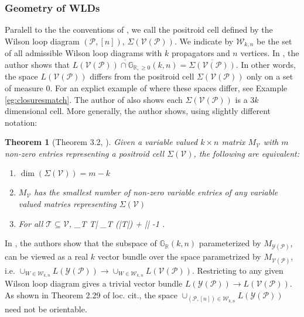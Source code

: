\documentclass[11pt]{article}
\newcommand{\R}{\mathbb{R}}
\newcommand{\Gr}{\mathbb{G}_{\R, \geq 0}}
\newcommand{\Grall}{\mathbb{G}_{\R}}
\def\bas #1\eas{\begin{align*} #1 \end{align*}}
\newcommand{\cP}{\mathcal{P}}
\newcommand{\cV}{\mathcal{V}}
\newcommand{\cY}{\mathcal{Y}}
\newcommand{\VP}{\cV(\cP)}
\newcommand{\YP}{\cY(\cP)}
\newcommand{\cW}{\mathcal{W}}
\newtheorem{thm}{Theorem}[section]
\theoremstyle{remark}
\theoremstyle{definition}
\begin{document}
\subsubsection{Geometry of WLDs \label{sec:geometry}}
Paralell to the the conventions of \cite{casestudy, generalcombinatorics1}, we call the positroid cell defined by the Wilson loop diagram $(\cP, [n])$, $\Sigma(\VP)$. We indicate by $\cW_{k,n}$ be the set of all admissible Wilson loop diagrams with $k$ propagators and $n$ vertices. In \cite[Theorem 8.4]{basisshapeloci}, the author shows that $\overline{L(\VP) \cap \Gr(k,n)} = \overline{\Sigma(\VP)}$. In other words, the space $L(\VP)$ differs from the positroid cell $\Sigma(\VP)$ only on a set of measure 0. For an explict example of where these spaces differ, see Example \ref{eg:closuresmatch}. The author of \cite{basisshapeloci} also shows each $\Sigma(\VP)$ is a $3k$ dimensional cell. More generally, the author shows, using slightly different notation:

\begin{thm}[Theorem 3.2, \cite{basisshapeloci}]\label{res:minimalrep}
Given a variable valued $k \times n$ matrix $M_\cV$ with $m$ non-zero entries representing a positroid cell $\Sigma(\cV)$, the following are equivalent:
\begin{enumerate}
\item $\dim(\Sigma(\cV)) = m -k$ 
\item $M_\cV$ has the smallest number of non-zero variable entries of any variable valued matries representing $\Sigma(\cV)$
\item For all $\mathcal{T} \subseteq \cV$, \bas |\bigcup_{T \in {}}T| \geq \max_{T \in  {}} (|T|) + || -1 \;. \eas
\end{enumerate}
\end{thm}


In \cite[section 2.3]{non-orientable}, the authors show that  the subspace of $\Grall(k,n)$ parameterized by $M_{\YP}$, can be viewed as a real $k$ vector bundle over the space parametrized by $M_{\VP}$, i.e.  $\cup_{W \in \cW_{k,n}}L(\YP) \rightarrow \cup_{W \in \cW_{k,n}}L(\VP)$. Restricting to any given Wilson loop diagram gives a trivial vector bundle $L(\YP) \rightarrow L(\VP)$. As shown in Theorem 2.29 of loc. cit., the space $\cup_{(\cP, [n]) \in \cW_{k,n}}L(\YP)$ need not be orientable. 
\end{document}
